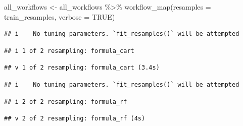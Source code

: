 \documentclass[
]{article}
\newenvironment{Shaded}{\begin{snugshade}}{\end{snugshade}}
\newcommand{\AttributeTok}[1]{\textcolor[rgb]{0.77,0.63,0.00}{#1}}
\newcommand{\ConstantTok}[1]{\textcolor[rgb]{0.00,0.00,0.00}{#1}}
\newcommand{\FunctionTok}[1]{\textcolor[rgb]{0.00,0.00,0.00}{#1}}
\newcommand{\NormalTok}[1]{#1}
\newcommand{\OtherTok}[1]{\textcolor[rgb]{0.56,0.35,0.01}{#1}}
\newcommand{\SpecialCharTok}[1]{\textcolor[rgb]{0.00,0.00,0.00}{#1}}
\begin{document}
\begin{Shaded}
\begin{Highlighting}[]
\NormalTok{all\_workflows }\OtherTok{\textless{}{-}} 
\NormalTok{  all\_workflows }\SpecialCharTok{\%\textgreater{}\%} 
  \FunctionTok{workflow\_map}\NormalTok{(}\AttributeTok{resamples =}\NormalTok{ train\_resamples, }\AttributeTok{verbose =} \ConstantTok{TRUE}\NormalTok{)}
\end{Highlighting}
\end{Shaded}

\begin{verbatim}
## i    No tuning parameters. `fit_resamples()` will be attempted
\end{verbatim}

\begin{verbatim}
## i 1 of 2 resampling: formula_cart
\end{verbatim}

\begin{verbatim}
## v 1 of 2 resampling: formula_cart (3.4s)
\end{verbatim}

\begin{verbatim}
## i    No tuning parameters. `fit_resamples()` will be attempted
\end{verbatim}

\begin{verbatim}
## i 2 of 2 resampling: formula_rf
\end{verbatim}

\begin{verbatim}
## v 2 of 2 resampling: formula_rf (4s)
\end{verbatim}
\end{document}
